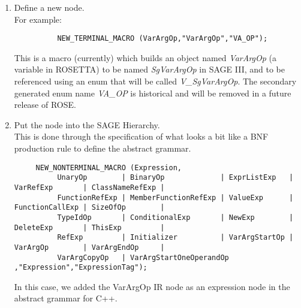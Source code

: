 \begin{enumerate}
     \item Define a new node. \\
           For example:
{\indent
{\mySmallFontSize
\begin{verbatim}
          NEW_TERMINAL_MACRO (VarArgOp,"VarArgOp","VA_OP");
\end{verbatim}
}}
           This is a macro (currently) which builds an object named {\em VarArgOp} (a variable in
           ROSETTA) to be named {\em SgVarArgOp} in SAGE III, and to be referenced using an enum
           that will be called {\em V\_SgVarArgOp}.  The secondary generated enum name {\em VA\_OP}
           is historical and will be removed in a future release of ROSE.

     \item Put the node into the SAGE Hierarchy. \\
           This is done through the specification of what looks a bit like a BNF
            production rule to define the abstract grammar. \\
{\indent
{\mySmallFontSize
\begin{verbatim}
     NEW_NONTERMINAL_MACRO (Expression,
          UnaryOp        | BinaryOp             | ExprListExp   | VarRefExp       | ClassNameRefExp |
          FunctionRefExp | MemberFunctionRefExp | ValueExp      | FunctionCallExp | SizeOfOp        |
          TypeIdOp       | ConditionalExp       | NewExp        | DeleteExp       | ThisExp         |
          RefExp         | Initializer          | VarArgStartOp | VarArgOp        | VarArgEndOp     |
          VarArgCopyOp   | VarArgStartOneOperandOp ,"Expression","ExpressionTag");
\end{verbatim} 
}}
        In this case, we added the VarArgOp IR node as an expression node in the
    abstract grammar for C++.


\end{enumerate}
